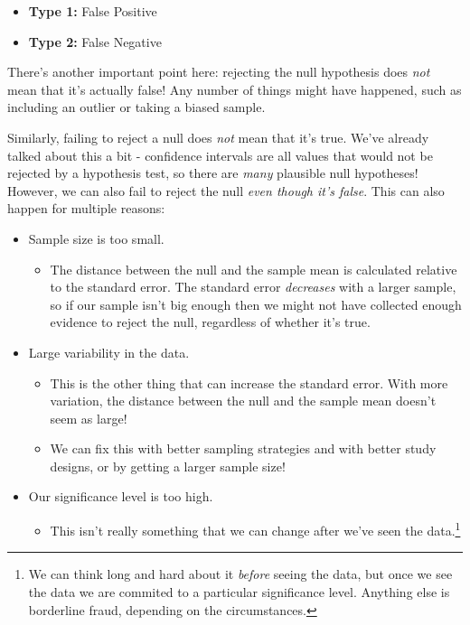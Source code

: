 \documentclass[
  letterpaper,
  DIV=11,
  numbers=noendperiod,
  oneside]{scrreprt}
\providecommand{\tightlist}{%
  \setlength{\itemsep}{0pt}\setlength{\parskip}{0pt}}\usepackage{longtable,booktabs,array}
\begin{document}
\begin{itemize}
\tightlist
\item
  \textbf{Type 1:} False Positive
\item
  \textbf{Type 2:} False Negative
\end{itemize}

There's another important point here: rejecting the null hypothesis does
\emph{not} mean that it's actually false! Any number of things might
have happened, such as including an outlier or taking a biased sample.

Similarly, failing to reject a null does \emph{not} mean that it's true.
We've already talked about this a bit - confidence intervals are all
values that would not be rejected by a hypothesis test, so there are
\emph{many} plausible null hypotheses! However, we can also fail to
reject the null \emph{even though it's false}. This can also happen for
multiple reasons:

\begin{itemize}
\tightlist
\item
  Sample size is too small.

  \begin{itemize}
  \tightlist
  \item
    The distance between the null and the sample mean is calculated
    relative to the standard error. The standard error \emph{decreases}
    with a larger sample, so if our sample isn't big enough then we
    might not have collected enough evidence to reject the null,
    regardless of whether it's true.
  \end{itemize}
\item
  Large variability in the data.

  \begin{itemize}
  \tightlist
  \item
    This is the other thing that can increase the standard error. With
    more variation, the distance between the null and the sample mean
    doesn't seem as large!
  \item
    We can fix this with better sampling strategies and with better
    study designs, or by getting a larger sample size!
  \end{itemize}
\item
  Our significance level is too high.

  \begin{itemize}
  \tightlist
  \item
    This isn't really something that we can change after we've seen the
    data.\footnote{We can think long and hard about it \emph{before}
      seeing the data, but once we see the data we are commited to a
      particular significance level. Anything else is borderline fraud,
      depending on the circumstances.}
  \end{itemize}
\end{itemize}
\end{document}
